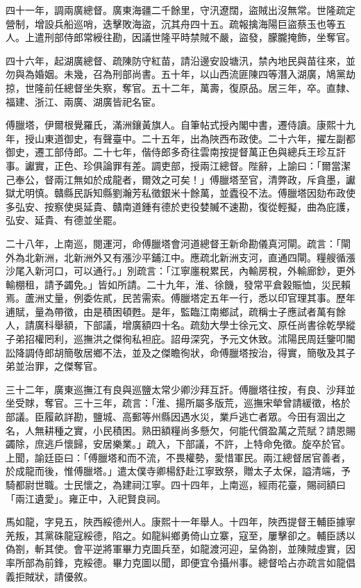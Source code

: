 \begin{pinyinscope}
四十一年，調兩廣總督。廣東海疆二千餘里，守汛遼闊，盜賊出沒無常。世隆疏定營制，增設兵船巡哨，迭擊敗海盜，沉其舟四十五。疏報擒海陽巨盜蔡玉也等五人。上遣刑部侍郎常綬往勘，因議世隆平時禁賊不嚴，盜發，朦朧掩飾，坐奪官。

四十六年，起湖廣總督、疏陳防守紅苗，請沿邊安設塘汛，禁內地民與苗往來，並勿與為婚姻。未幾，召為刑部尚書。五十年，以山西流匪陳四等潛入湖廣，鳩黨劫掠，世隆前任總督坐失察，奪官。五十二年，萬壽，復原品。居三年，卒。直隸、福建、浙江、兩廣、湖廣皆祀名宦。

傅臘塔，伊爾根覺羅氏，滿洲鑲黃旗人。自筆帖式授內閣中書，遷侍讀。康熙十九年，授山東道御史，有聲臺中。二十五年，出為陜西布政使。二十六年，擢左副都御史，遷工部侍郎。二十七年，偕侍郎多奇往雲南按提督萬正色與總兵王珍互訐事。讞實，正色、珍俱論罪有差。調吏部，授兩江總督。陛辭，上諭曰：「爾當潔己奉公，督兩江無如於成龍者，爾效之可矣！」傅臘塔至官，清弊政，斥貪墨，讞獄尤明慎。贛縣民訴知縣劉瀚芳私徵銀米十餘萬，並蠹役不法。傅臘塔因劾布政使多弘安、按察使吳延貴、贛南道鍾有德於吏役婪贓不速勘，復從輕擬，曲為庇護，弘安、延貴、有德並坐罷。

二十八年，上南巡，閱運河，命傅臘塔會河道總督王新命勘儀真河閘。疏言：「閘外為北新洲，北新洲外又有漲沙平鋪江中。應疏北新洲支河，直通四閘。糧艘循漲沙尾入新河口，可以通行。」別疏言：「江寧廛稅累民，內輸房稅，外輸廊鈔，更外輸棚租，請予蠲免。」皆如所請。二十九年，淮、徐饑，發常平倉穀賑恤，災民賴焉。蘆洲丈量，例委佐貳，民苦需索。傅臘塔定五年一行，悉以印官理其事。歷年逋賦，量為帶徵，由是積困頓甦。是年，監臨江南鄉試，疏稱士子應試者萬有餘人，請廣科舉額，下部議，增廣額四十名。疏劾大學士徐元文、原任尚書徐乾學縱子弟招權罔利，巡撫洪之傑徇私袒庇。詔毋深究，予元文休致。沭陽民周廷鑒叩閽訟降調侍郎胡簡敬居鄉不法，並及之傑瞻徇狀，命傅臘塔按治，得實，簡敬及其子弟並治罪，之傑奪官。

三十二年，廣東巡撫江有良與巡鹽太常少卿沙拜互訐。傅臘塔往按，有良、沙拜並坐受賕，奪官。三十三年，疏言：「淮、揚所屬多版荒，巡撫宋犖曾請緩徵，格於部議。臣履畝詳勘，鹽城、高郵等州縣因遇水災，業戶逃亡者眾。今田有涸出之名，人無耕種之實，小民積困。熟田額糧尚多懸欠，何能代償盈萬之荒賦？請恩賜蠲除，庶逃戶懷歸，安居樂業。」疏入，下部議，不許，上特命免徵。旋卒於官。上聞，諭廷臣曰：「傅臘塔和而不流，不畏權勢，愛惜軍民。兩江總督居官善者，於成龍而後，惟傅臘塔。」遣太僕寺卿楊舒赴江寧致祭，贈太子太保，謚清端，予騎都尉世職。士民懷之，為建祠江寧。四十四年，上南巡，經雨花臺，賜祠額曰「兩江遺愛」。雍正中，入祀賢良祠。

馬如龍，字見五，陜西綏德州人。康熙十一年舉人。十四年，陜西提督王輔臣據寧羌叛，其黨硃龍寇綏德，陷之。如龍糾鄉勇倚山立寨，寇至，屢擊卻之。輔臣誘以偽劄，斬其使。會平逆將軍畢力克圖兵至，如龍渡河迎，呈偽劄，並陳賊虛實，因率所部為前鋒，克綏德。畢力克圖以聞，即便宜令攝州事。總督哈占亦疏言如龍倡義拒賊狀，請優敘。


\end{pinyinscope}
